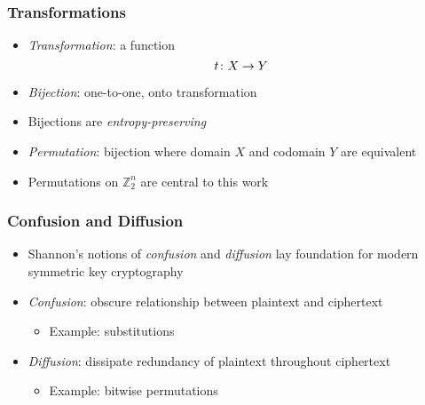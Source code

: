 \begin{frame}
\frametitle{Transformations}
\begin{itemize}
  \item \emph{Transformation}: a function
  \begin{equation*}
    t \colon X \rightarrow Y
  \end{equation*}
  \item \emph{Bijection}: one-to-one, onto transformation
  \item Bijections are \emph{entropy-preserving}
  \item \emph{Permutation}: bijection where domain $X$ and codomain $Y$ are equivalent
  \item Permutations on $\mathbb{Z}_2^n$ are central to this work
\end{itemize}
\end{frame}

\begin{frame}
\frametitle{Confusion and Diffusion}
\begin{itemize}
  \item Shannon's notions of \emph{confusion} and \emph{diffusion} lay foundation for modern symmetric key cryptography
  \item \emph{Confusion}: obscure relationship between plaintext and ciphertext
  \begin{itemize}
    \item Example: substitutions
  \end{itemize}
  \item \emph{Diffusion}: dissipate redundancy of plaintext throughout ciphertext 
  \begin{itemize}
    \item Example: bitwise permutations 
  \end{itemize}
\end{itemize}
\end{frame}

